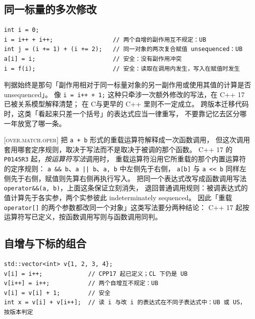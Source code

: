 \documentclass[12pt,a4paper,fontset=fandol]{ctexbook}
\newcommand{\Tp}[1]{\texttt{#1}}
\newcommand{\Lang}[1]{\textsf{#1}}
\newcommand{\CL}{\Lang{C}}
\newcommand{\CPP}{\Lang{C++}}
\newcommand{\Std}[1]{\textsc{[#1]}}
\newcommand{\Feat}[1]{\texttt{#1}}
\begin{document}
\subsection{同一标量的多次修改}\label{sec:ub08-multi-modify}

\begin{lstlisting}[style=cppstyle,caption={写写冲突：仍然没有意义的写法}]
int i = 0;
i = i++ + i++;                 // 两个自增的副作用互不规定：UB
int j = (i += 1) + (i += 2);   // 同一对象的两次复合赋值 unsequenced：UB
a[i] = i;                      // 安全：没有副作用冲突
i = f(i);                      // 安全：读取在调用内发生，写入在赋值时发生
\end{lstlisting}

判据始终是那句「副作用相对于同一标量对象的另一副作用或使用其值的计算是否 unsequenced」。
像 \Tp{i = i++ + 1;} 这种只牵涉一次额外修改的写法，在 \CPP{} 17 已被关系模型解释清楚；
在 \CL 与更早的 \CPP{} 里则不一定成立。
跨版本迁移代码时，这类「看起来只差一个括号」的表达式应当一律重写，
不要靠记忆去区分哪一年放宽了哪一条。

\begin{clause}[title={重载运算符的次序看写法，不看函数}]
\Std{over.match.oper} 把 \Tp{a + b} 形式的重载运算符解释成一次函数调用，
但这次调用套用哪套定序规则，取决于写法而不是取决于被调的那个函数。
\CPP{} 17 的 \Feat{P0145R3} 起，\emph{按运算符写法}调用时，
重载运算符沿用它所重载的那个内置运算符的定序规则：
\Tp{a \&\& b}、\Tp{a || b}、\Tp{a, b} 中左侧先于右侧，
\Tp{a[b]} 与 \Tp{a << b} 同样左侧先于右侧，赋值则先算右侧再执行写入。
把同一个表达式改写成函数调用写法 \Tp{operator\&\&(a, b)}，上面这条保证立刻消失，
退回普通调用规则：被调表达式的值计算先于各实参，两个实参彼此 indeterminately sequenced。
因此「重载 \Tp{operator[]} 的两个参数都改同一个对象」这类写法要分两种结论：
\CPP{} 17 起按运算符写已定义，按函数调用写则与函数调用同判。
\end{clause}

\subsection{自增与下标的组合}\label{sec:ub08-index}

\begin{lstlisting}[style=cppstyle,caption={下标表达式里的读与写}]
std::vector<int> v{1, 2, 3, 4};
v[i] = i++;             // CPP17 起已定义；CL 下仍是 UB
v[i++] = i++;           // 两个自增互不规定：UB
v[i] = v[i] + 1;        // 安全
int x = v[i] + v[i++];  // 读 i 与改 i 的表达式在不同子表达式中：UB 或 US，按版本判定
\end{lstlisting}
\end{document}
